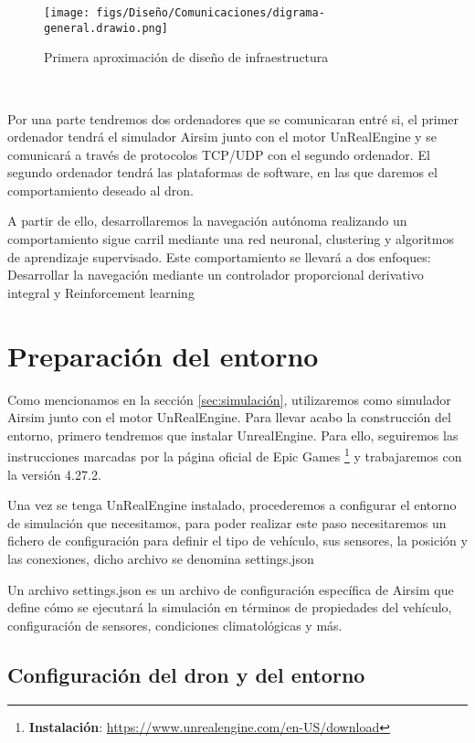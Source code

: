 \begin{figure} [H]
    \begin{center}
      \texttt{[image: figs/Diseño/Comunicaciones/digrama-general.drawio.png]}
    \end{center}
    \caption{Primera aproximación de diseño de infraestructura}
    \label{fig:infraestructura}
  \end{figure}\

Por una parte tendremos dos ordenadores que se comunicaran entré si, el primer ordenador tendrá el simulador Airsim junto con el motor UnRealEngine y se comunicará a través
de protocolos TCP/UDP con el segundo ordenador. El segundo ordenador tendrá las plataformas de software, en las que daremos el comportamiento deseado al dron. 

A partir de ello, desarrollaremos la navegación autónoma realizando un comportamiento sigue carril mediante una red neuronal, clustering y algoritmos de aprendizaje supervisado. Este comportamiento
se llevará a dos enfoques: Desarrollar la navegación mediante un controlador proporcional derivativo integral y Reinforcement learning 

\section{Preparación del entorno}
\label{sec:Preparación_entorno}

Como mencionamos en la sección \ref{sec:simulación}, utilizaremos como simulador Airsim junto con el motor UnRealEngine. Para llevar acabo la construcción del entorno, primero tendremos 
que instalar UnrealEngine. Para ello, seguiremos las instrucciones marcadas por la página oficial de Epic Games \footnote{\textbf{Instalación}: \url{https://www.unrealengine.com/en-US/download}} y trabajaremos con la versión 4.27.2. 

Una vez se tenga UnRealEngine instalado, procederemos a configurar el entorno de simulación que necesitamos, para poder realizar este paso necesitaremos un fichero de configuración para definir el tipo de vehículo, sus sensores, la posición y las conexiones, dicho archivo se denomina settings.json

Un archivo settings.json es un archivo de configuración específica de Airsim que define cómo se ejecutará la simulación en términos de propiedades del vehículo, configuración de sensores, condiciones climatológicas y más. 

\subsection{Configuración del dron y del entorno}
\label{subsec:Configuración del dron y del entorno}

